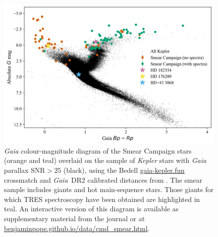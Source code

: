 \documentclass[a4paper,fleqn,usenatbib]{mnras}
\newcommand{\kepler}{\emph{Kepler}\xspace}
\newcommand{\gaia}{\emph{Gaia}\xspace}
\begin{document}
\begin{figure}
\noindent\includegraphics[width=15cm,keepaspectratio]{gaia_kepler_hr.png}

\caption{\label{hrdiagram}
\gaia colour-magnitude diagram of the Smear Campaign stars (orange and teal) overlaid on the sample of \kepler stars with \gaia parallax $\text{SNR} > 25$ (black), using the Bedell \url{gaia-kepler.fun} crossmatch and \gaia~DR2 calibrated distances from \citet{gaiadists}. The smear sample includes giants and hot main-sequence stars. Those giants for which TRES spectroscopy have been obtained are highlighted in teal. An interactive version of this diagram is available as supplementary material from the journal or at \url{benjaminpope.github.io/data/cmd_smear.html}.}
\end{figure}

\end{document}
